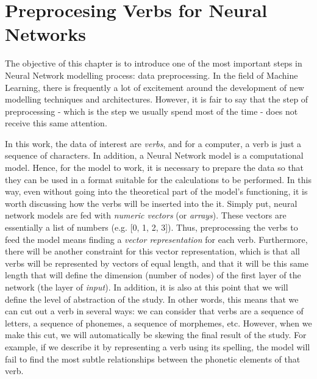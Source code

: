 \chapter{Preprocesing Verbs for Neural Networks}
\label{ch:02}


The objective of this chapter is to introduce one of the most important steps in Neural Network modelling process: data preprocessing. In the field of Machine Learning, there is frequently a lot of excitement around the development of new modelling techniques and architectures. However, it is fair to say that the step of preprocessing - which is the step we usually spend most of the time -  does not receive this same attention.

In this work, the data of interest are \textit{verbs}, and for a computer, a verb is just a sequence of characters. In addition, a Neural Network model is a computational model. Hence, for the model to work, it is necessary to prepare the data so that they can be used in a format suitable for the calculations to be performed. In this way, even without going into the theoretical part of the model's functioning, it is worth discussing how the verbs will be inserted into the it. Simply put, neural network models are fed with \textit{numeric vectors} (or \textit{arrays}). These vectors are essentially a list of numbers (e.g. [0, 1, 2, 3]). Thus, preprocessing the verbs to feed the model means finding a \textit{vector representation} for each verb. Furthermore, there will be another constraint for this vector representation, which is that all verbs will be represented by vectors of equal length, and that it will be this same length that will define the dimension (number of nodes) of the first layer of the network (the layer of \textit{input}). In addition, it is also at this point that we will define the level of abstraction of the study. In other words, this means that we can cut out a verb in several ways: we can consider that verbs are a sequence of letters, a sequence of phonemes, a sequence of morphemes, etc. However, when we make this cut, we will automatically be skewing the final result of the study. For example, if we describe it by representing a verb using its spelling, the model will fail to find the most subtle relationships between the phonetic elements of that verb. 

